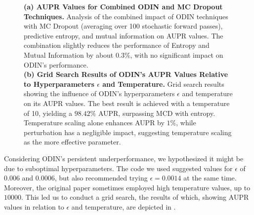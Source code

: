 \begin{figure}[H]
\begin{subfigure}{0.45\textwidth}
        \caption{}
        \label{fig:odin_grid_search}
    \end{subfigure}%
    \caption{\textbf{(a) AUPR Values for Combined ODIN and MC Dropout Techniques.} Analysis of the combined impact of ODIN techniques with MC Dropout (averaging over 100 stochastic forward passes), predictive entropy, and mutual information on AUPR values. The combination slightly reduces the performance of Entropy and Mutual Information by about $0.3\%$, with no significant impact on ODIN's performance.\\\textbf{(b) Grid Search Results of ODIN's AUPR Values Relative to Hyperparameters $\epsilon$ and Temperature.} Grid search results showing the influence of ODIN's hyperparameters $\epsilon$ and temperature on its AUPR values. The best result is achieved with a temperature of 10, yielding a $98.42\%$ AUPR, surpassing MCD with entropy. Temperature scaling alone enhances AUPR by $1\%$, while perturbation has a negligible impact, suggesting temperature scaling as the more effective parameter.}
\end{figure}

Considering ODIN's persistent underperformance, we hypothesized it might be due to suboptimal hyperparameters. The code we used suggested values for $ \epsilon $ of $0.006$ and $0.0006$, but also recommended trying $ \epsilon = 0.0014 $ at the same time. Moreover, the original paper sometimes employed high temperature values, up to $10000$. This led us to conduct a grid search, the results of which, showing AUPR values in relation to $ \epsilon $ and temperature, are depicted in .

